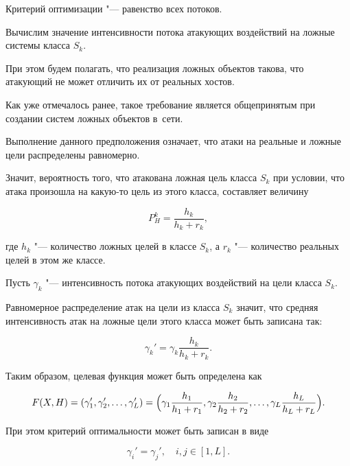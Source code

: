 Критерий оптимизации "--- равенство всех потоков.



Вычислим значение интенсивности потока атакующих воздействий на ложные системы класса $S_k$. 

При этом будем полагать, что реализация ложных объектов такова, что атакующий не может отличить их от реальных хостов. 

Как уже отмечалось ранее, такое требование является общепринятым при создании систем ложных объектов в~сети. 

Выполнение данного предположения означает, что атаки на реальные и ложные цели распределены равномерно. 

Значит, вероятность того, что атакована ложная цель класса $S_k$ при условии, что атака произошла на какую-то цель из этого класса, составляет величину

$$

P_H^k =  \frac{h_k}{h_k+r_k},

$$

где $h_k$ "--- количество ложных целей в классе $S_k$, а $r_k$ "--- количество реальных целей в этом же классе.



Пусть $\gamma_k$ "--- интенсивность потока атакующих воздействий на цели класса $S_k$. 

Равномерное распределение атак на цели из класса $S_k$ значит, что средняя интенсивность атак на ложные цели этого класса может быть записана так:

$$

\gamma_k' = \gamma_k \frac{h_k}{h_k+r_k} .

$$



Таким образом, целевая функция может быть определена как

\begin{equation}

F(X,H) = (\gamma_1', \gamma_2', \ldots, \gamma_L') =

\Bigl ({\gamma_1 \frac{h_1}{h_1+r_1}}, {\gamma_2 \frac{h_2}{h_2+r_2}}, \ldots, {\gamma_L \frac{h_L}{h_L+r_L}} \Bigr ). 

\label{eq:target_f}

\end{equation}

При этом  критерий оптимальности может быть записан в виде

\begin{equation}

\gamma_i' = \gamma_j', \quad  i, j \in [1, L] .\label{eq:criteria_gamma}

\end{equation}



